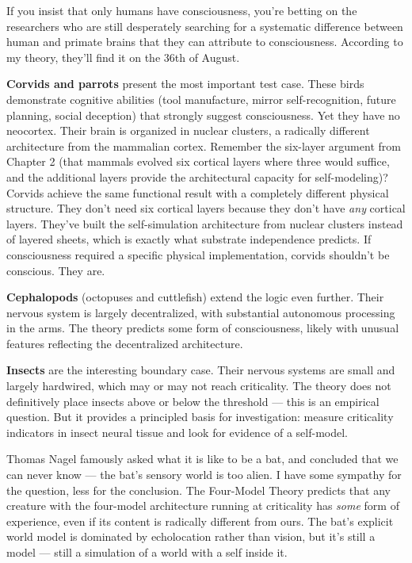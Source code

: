 \documentclass[11pt, twoside, openright]{book}
\begin{document}
If you insist that only humans have consciousness, you're betting on the researchers who are still desperately searching for a systematic difference between human and primate brains that they can attribute to consciousness. According to my theory, they'll find it on the 36th of August.

\textbf{Corvids and parrots} present the most important test case. These birds demonstrate cognitive abilities (tool manufacture, mirror self-recognition, future planning, social deception) that strongly suggest consciousness. Yet they have no neocortex. Their brain is organized in nuclear clusters, a radically different architecture from the mammalian cortex. Remember the six-layer argument from Chapter 2 (that mammals evolved six cortical layers where three would suffice, and the additional layers provide the architectural capacity for self-modeling)? Corvids achieve the same functional result with a completely different physical structure. They don't need six cortical layers because they don't have \textit{any} cortical layers. They've built the self-simulation architecture from nuclear clusters instead of layered sheets, which is exactly what substrate independence predicts. If consciousness required a specific physical implementation, corvids shouldn't be conscious. They are.

\textbf{Cephalopods} (octopuses and cuttlefish) extend the logic even further. Their nervous system is largely decentralized, with substantial autonomous processing in the arms. The theory predicts some form of consciousness, likely with unusual features reflecting the decentralized architecture.

\textbf{Insects} are the interesting boundary case. Their nervous systems are small and largely hardwired, which may or may not reach criticality. The theory does not definitively place insects above or below the threshold --- this is an empirical question. But it provides a principled basis for investigation: measure criticality indicators in insect neural tissue and look for evidence of a self-model.

Thomas Nagel famously asked what it is like to be a bat, and concluded that we can never know --- the bat's sensory world is too alien. I have some sympathy for the question, less for the conclusion. The Four-Model Theory predicts that any creature with the four-model architecture running at criticality has \textit{some} form of experience, even if its content is radically different from ours. The bat's explicit world model is dominated by echolocation rather than vision, but it's still a model --- still a simulation of a world with a self inside it.
\end{document}
